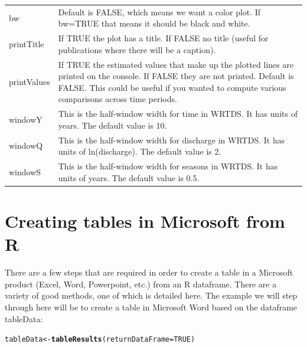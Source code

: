 \documentclass[a4paper,11pt]{article}\usepackage{graphicx, color}
\makeatletter
\newcommand{\hlfunctioncall}[1]{\textcolor[rgb]{0.501960784313725,0,0.329411764705882}{\textbf{#1}}}%
\newenvironment{kframe}{%
 \def\at@end@of@kframe{}%
 \ifinner\ifhmode%
  \def\at@end@of@kframe{\end{minipage}}%
  \begin{minipage}{\columnwidth}%
 \fi\fi%
 \def\FrameCommand##1{\hskip\@totalleftmargin \hskip-\fboxsep
 \colorbox{shadecolor}{##1}\hskip-\fboxsep
     \hskip-\linewidth \hskip-\@totalleftmargin \hskip\columnwidth}%
 \MakeFramed {\advance\hsize-\width
   \@totalleftmargin\z@ \linewidth\hsize
   \@setminipage}}%
 {\par\unskip\endMakeFramed%
 \at@end@of@kframe}
\newenvironment{knitrout}{}{} %
\makeatother
\begin{document}
\begin{table}[ht]
\begin{tabularx}{\textwidth}{lX}
bw & Default is FALSE, which means we want a color plot.  If bw=TRUE that means it should be black and white.\\
printTitle & If TRUE the plot has a title.  If FALSE no title (useful for publications where there will be a caption).\\
printValues & If TRUE the estimated values that make up the plotted lines are printed on the console.  If FALSE they are not printed.  Default is FALSE.  This could be useful if you wanted to compute various comparisons across time periods.\\
windowY & This is the half-window width for time in WRTDS.  It has units of years.  The default value is 10. \\
windowQ & This is the half-window width for discharge in WRTDS.  It has units of ln(discharge).  The default value is 2. \\
windowS & This is the half-window width for seasons in WRTDS.  It has units of years.  The default value is 0.5. \\
\hline
\end{tabularx}

\end{table}

\FloatBarrier


\section{Creating tables in Microsoft from R}
\label{app:createWordTable}
There are a few steps that are required in order to create a table in a Microsoft product (Excel, Word, Powerpoint, etc.) from an R dataframe. There are a variety of good methods, one of which is detailed here. The example we will step through here will be to create a table in Microsoft Word based on the dataframe tableData:

\begin{knitrout}
\color{fgcolor}\begin{kframe}
\begin{alltt}

tableData <- \hlfunctioncall{tableResults}(returnDataFrame=TRUE)
\end{alltt}
\end{kframe}
\end{knitrout}
\end{document}

